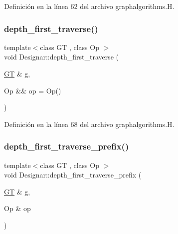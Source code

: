 Definición en la línea 62 del archivo graphalgorithms.\+H.

\mbox{\label{namespace_designar_a40329a328d24d8ac25f540902fb69159}} 
\subsubsection{\texorpdfstring{depth\+\_\+first\+\_\+traverse()}{depth\_first\_traverse()}\hspace{0.1cm}{\footnotesize\ttfamily [2/2]}}
{\footnotesize\ttfamily template$<$class GT , class Op $>$ \\
void Designar\+::depth\+\_\+first\+\_\+traverse (\begin{DoxyParamCaption}\item[{\hyperlink{demo-buildgraph_8_c_a3001c40d2c31ca87ed96cd7d1334a55e}{GT} \&}]{g,  }\item[{Op \&\&}]{op = {\ttfamily Op()} }\end{DoxyParamCaption})}



Definición en la línea 68 del archivo graphalgorithms.\+H.

\mbox{\label{namespace_designar_a2c0d9c0ea5841058afe514c4451ab869}} 
\subsubsection{\texorpdfstring{depth\+\_\+first\+\_\+traverse\+\_\+prefix()}{depth\_first\_traverse\_prefix()}\hspace{0.1cm}{\footnotesize\ttfamily [1/2]}}
{\footnotesize\ttfamily template$<$class GT , class Op $>$ \\
void Designar\+::depth\+\_\+first\+\_\+traverse\+\_\+prefix (\begin{DoxyParamCaption}\item[{\hyperlink{demo-buildgraph_8_c_a3001c40d2c31ca87ed96cd7d1334a55e}{GT} \&}]{g,  }\item[{Op \&}]{op }\end{DoxyParamCaption})}



